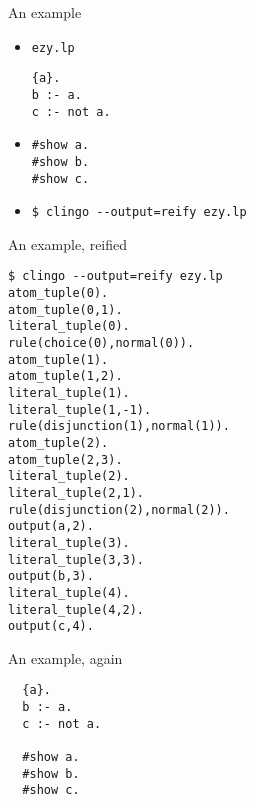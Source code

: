 \begin{frame}[fragile]{An example}
  \begin{itemize}
  \item {} \texttt{ezy.lp}
\begin{lstlisting}
{a}.
b :- a.
c :- not a.
\end{lstlisting}
  \item<2-> 
\begin{lstlisting}
#show a.
#show b.
#show c.
\end{lstlisting}
  \item<3-> 
\begin{lstlisting}
$ clingo --output=reify ezy.lp
\end{lstlisting}
  \end{itemize}
\end{frame}
\begin{frame}[fragile,shrink=28]{An example, reified}
\bigskip
\begin{lstlisting}
$ clingo --output=reify ezy.lp
atom_tuple(0).
atom_tuple(0,1).
literal_tuple(0).
rule(choice(0),normal(0)).
atom_tuple(1).
atom_tuple(1,2).
literal_tuple(1).
literal_tuple(1,-1).
rule(disjunction(1),normal(1)).
atom_tuple(2).
atom_tuple(2,3).
literal_tuple(2).
literal_tuple(2,1).
rule(disjunction(2),normal(2)).
output(a,2).
literal_tuple(3).
literal_tuple(3,3).
output(b,3).
literal_tuple(4).
literal_tuple(4,2).
output(c,4).
\end{lstlisting}
\end{frame}
\begin{frame}[fragile]{An example, again}
\bigskip
\begin{lstlisting}
  {a}.
  b :- a.
  c :- not a.

  #show a.
  #show b.
  #show c.
\end{lstlisting}
\end{frame}
